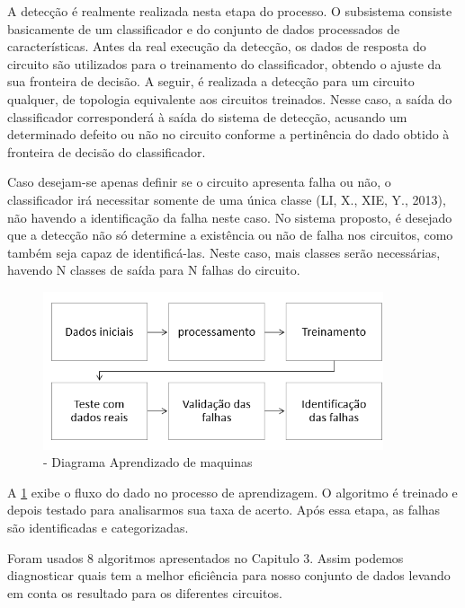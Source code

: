A detecção é realmente realizada nesta etapa do processo. O subsistema consiste basicamente de um classificador e do conjunto de dados processados de características. Antes da real execução da detecção, os dados de resposta do circuito são utilizados para o treinamento do classificador, obtendo o ajuste da sua fronteira de decisão. A seguir, é realizada a detecção para um circuito qualquer, de topologia equivalente aos circuitos treinados. Nesse caso, a saída do classificador corresponderá à saída do sistema de detecção, acusando um determinado defeito ou não no circuito conforme a pertinência do dado obtido à fronteira de decisão do classificador.



Caso desejam-se apenas definir se o circuito apresenta falha ou não, o classificador irá necessitar somente de uma única classe (LI, X., XIE, Y., 2013), não havendo a identificação da falha neste caso. No sistema proposto, é desejado que a detecção não só determine a existência ou não de falha nos circuitos, como também seja capaz de identificá-las. Neste caso, mais classes serão necessárias, havendo N classes de saída para N falhas do circuito.


\begin{figure}[H]
\begin{center}
\includegraphics[width=10cm]{./04_Cap4/figures/fluxomachine.PNG}
\caption{\label{fig:fluxomachine}- Diagrama Aprendizado de maquinas}
\end{center}
\end{figure}

A \ref{fig:fluxomachine} exibe o fluxo do dado no processo de aprendizagem. O algoritmo é treinado e depois testado para analisarmos sua taxa de acerto. Após essa etapa, as falhas são identificadas e categorizadas. 

Foram usados 8 algoritmos apresentados no Capitulo 3. Assim podemos diagnosticar quais tem a melhor eficiência para nosso conjunto de dados levando em conta os resultado para os diferentes circuitos. 


